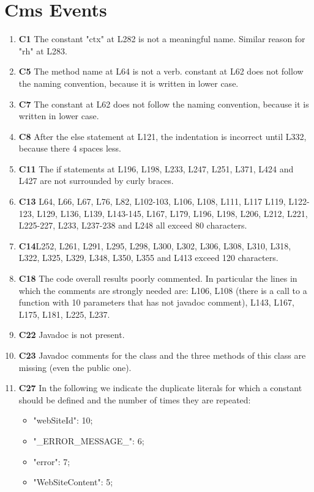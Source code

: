 \section{Cms Events}

\begin{enumerate}
\item \textbf{C1} The constant "ctx" at L282 is not a meaningful name. Similar reason for "rh" at L283.
\item \textbf{C5} The method name at L64 is not a verb. constant at L62 does not follow the naming convention, because it is written in lower case.
\item \textbf{C7} The constant at L62 does not follow the naming convention, because it is written in lower case.
\item \textbf{C8} After the else statement at L121, the indentation is incorrect until L332, because there 4 spaces less.
\item \textbf{C11} The if statements at L196, L198, L233, L247, L251, L371, L424 and L427 are not surrounded by curly braces.
\item \textbf{C13} L64, L66, L67, L76, L82, L102-103, L106, L108, L111, L117 L119, L122-123, L129, L136, L139, L143-145, L167, L179, L196, L198, L206, L212, L221, L225-227, L233, L237-238 and L248 all exceed 80 characters.
\item \textbf{C14}L252, L261, L291, L295, L298, L300, L302, L306, L308, L310, L318, L322, L325, L329, L348, L350, L355 and L413 exceed 120 characters.
\item \textbf{C18} The code overall results poorly commented. In particular the lines in which the comments are strongly needed are: L106, L108 (there is a call to a function with 10 parameters that has not javadoc comment), L143, L167, L175, L181, L225, L237.
\item \textbf{C22} Javadoc is not present.
\item \textbf{C23} Javadoc comments for the class and the three methods of this class are missing (even the public one).
\item \textbf{C27} In the following we indicate the duplicate literals for which a constant should be defined and the number of times they are repeated:
	\begin{itemize}
	\item "webSiteId": 10;
	\item "\_ERROR\_MESSAGE\_": 6;
	\item "error": 7;
	\item "WebSiteContent": 5;

\end{itemize}
\end{enumerate}
